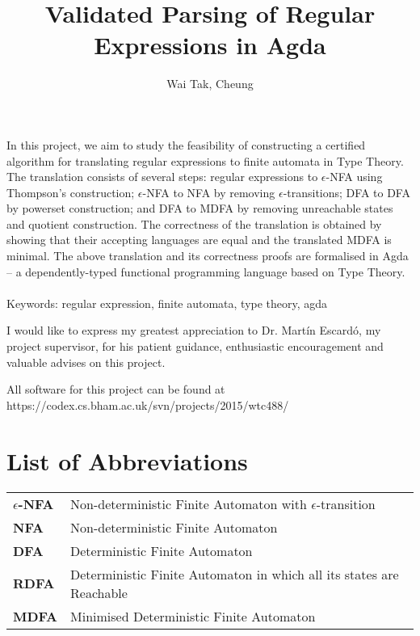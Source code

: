 \documentclass[twoside,openright,final]{bhamthesis}
\title{\textbf{Validated Parsing of Regular Expressions in Agda}}
\author{Wai Tak, Cheung}
\begin{document}
\maketitle


\abstract
\par In this project, we aim to study the feasibility of
constructing a certified algorithm for translating regular expressions
to finite automata in Type Theory. The translation consists of several steps: regular expressions
to \(\epsilon\)-NFA using Thompson's
construction; \(\epsilon\)-NFA to NFA by removing
\(\epsilon\)-transitions; DFA to DFA by powerset construction; and DFA
to MDFA by removing unreachable states and quotient construction. The
correctness of the translation is obtained by
showing that their accepting languages are equal and the translated
MDFA is minimal. The above
translation and its correctness proofs are formalised in Agda -- a
dependently-typed functional programming language based on Type Theory. 
\\ \\
Keywords: regular expression, finite automata, type theory, agda

\acknowledgments
\par I would like to express my greatest appreciation to Dr. Martín
Escardó, my project supervisor, for his patient guidance, enthusiastic
encouragement and valuable advises on this project. 

\repository
\vspace{7cm}
\begin{center}
  All software for this project can be found at \\
  https://codex.cs.bham.ac.uk/svn/projects/2015/wtc488/
\end{center}

\chapter*{List of Abbreviations}
\let\cleardoublepage\clearpage
\begin{tabular}{ll}
  \textbf{\(\epsilon\)-NFA} & Non-deterministic Finite Automaton with
                              \(\epsilon\)-transition \\
  \textbf{NFA} & Non-deterministic Finite Automaton \\
  \textbf{DFA} & Deterministic Finite Automaton \\
  \textbf{RDFA} & Deterministic Finite Automaton in which all its states are
                  Reachable \\
  \textbf{MDFA} & Minimised Deterministic Finite Automaton
\end{tabular}
\end{document}

